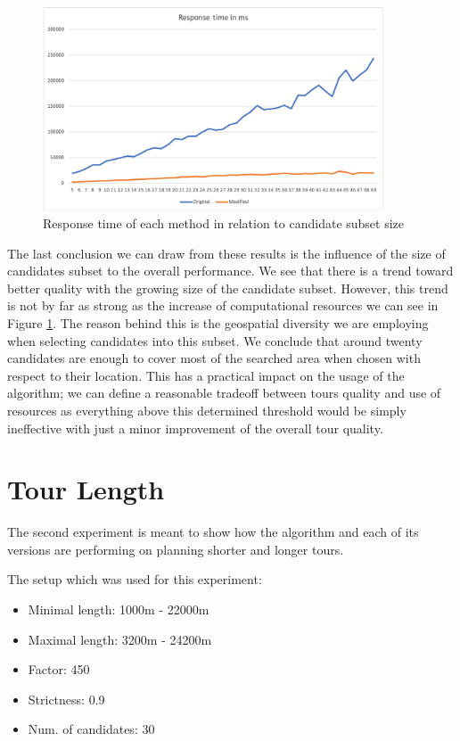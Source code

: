 \documentclass{ctuthesis}
\begin{document}
 

\begin{figure}
	\includegraphics[width=0.9\textwidth]{candsTime.png}
	\caption{Response time of each method in relation to candidate subset size}
	\label{fig:candsTime}
\end{figure}

The last conclusion we can draw from these results is the influence of the size of candidates subset to the overall performance. We see that there is a trend toward better quality with the growing size of the candidate subset. However, this trend is not by far as strong as the increase of computational resources we can see in Figure \ref{fig:candsTime}. The reason behind this is the geospatial diversity we are employing when selecting candidates into this subset. We conclude that around twenty candidates are enough to cover most of the searched area when chosen with respect to their location. This has a practical impact on the usage of the algorithm; we can define a reasonable tradeoff between tours quality and use of resources as everything above this determined threshold would be simply ineffective with just a minor improvement of the overall tour quality.




\section{Tour Length} \label{sec:length}
The second experiment is meant to show how the algorithm and each of its versions are performing on planning shorter and longer tours.\par 
\begin{minipage}[t]{0.9\textwidth}
The setup which was used for this experiment:
\begin{itemize}
  \item Minimal length: 1000m - 22000m
  \item Maximal length: 3200m - 24200m
  \item Factor: 450
  \item Strictness: 0.9
  \item Num. of candidates: 30
\end{itemize}
\end{minipage}
\vspace{20px}
\end{document}
